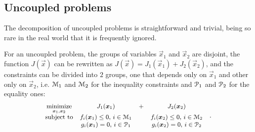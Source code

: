 \documentclass[../main.tex]{subfiles}
\begin{document}
\subsection{Uncoupled problems}\label{sec:uncoupled_problems}
The decomposition of uncoupled problems is straightforward and trivial, being so rare in the real world that it is frequently ignored.

 For an uncoupled problem, the groups of variables $\vec{x}_{1}$ and $\vec{x}_{2}$ are disjoint, the function $J(\vec{x})$ can be rewritten  as $J(\vec{x})=J_{1}(\vec{x}_{1})+J_{2}(\vec{x}_{2})$, and the constraints can be divided into $2$ groups, one that depends only on $\vec{x}_{1}$ and other only on $\vec{x}_{2}$, i.e. $\mathcal{M}_{1}$ and $\mathcal{M}_{2}$ for the inequality constraints and $\mathcal{P}_{1}$ and $\mathcal{P}_{2}$ for the equality ones:
\begin{equation}\label{eq:general_uncoupled_optimization_problem}
  \small
  \begin{aligned}
    \begin{matrix}
      \mathop{\textrm{minimize}}\limits_{\boldsymbol{x}_{1},\boldsymbol{x}_{2}}  &J_{1}(\boldsymbol{x}_{1})&+&J_{2}(\boldsymbol{x}_{2})&\\
      \mathrm{subject~ to} &

           f_{i}(\boldsymbol{x}_{1}) \leq 0 \text{, } i\in\mathcal{M}_{1}& & f_{i}(\boldsymbol{x}_{2}) \leq 0 \text{, } i\in\mathcal{M}_{2}\\
          & g_{i}(\boldsymbol{x}_{1}) = 0\text{, } i\in\mathcal{P}_{1}& & g_{i}(\boldsymbol{x}_{2}) = 0\text{, } i\in\mathcal{P}_{2}\\
    \end{matrix}
  \end{aligned}.
\end{equation}
\end{document}
